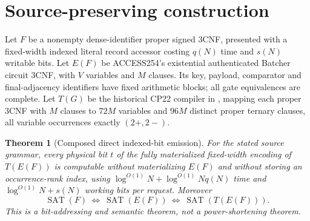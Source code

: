 \documentclass[11pt]{article}
\newtheorem{theorem}{Theorem}
\begin{document}
\section{Source-preserving construction}
Let $F$ be a nonempty dense-identifier proper signed 3CNF, presented with a fixed-width indexed literal record accessor costing $q(N)$ time and $s(N)$ writable bits. Let $E(F)$ be ACCESS254's existential authenticated Batcher circuit 3CNF, with $V$ variables and $M$ clauses. Its key, payload, comparator and final-adjacency identifiers have fixed arithmetic blocks; all gate equivalences are complete. Let $T(G)$ be the historical CP22 compiler in , mapping each proper 3CNF with $M$ clauses to $72M$ variables and $96M$ distinct proper ternary clauses, all variable occurrences exactly $(2+,2-)$.
\begin{theorem}[Composed direct indexed-bit emission]
For the stated source grammar, every physical bit $t$ of the fully materialized fixed-width encoding of $T(E(F))$ is computable without materializing $E(F)$ and without storing an occurrence-rank index, using $\log^{O(1)}N+\log^{O(1)}N q(N)$ time and $\log^{O(1)}N+s(N)$ working bits per request. Moreover
\[
 \operatorname{SAT}(F)\ \Longleftrightarrow\
 \operatorname{SAT}(E(F))\ \Longleftrightarrow\
 \operatorname{SAT}(T(E(F))).
\]
This is a bit-addressing and semantic theorem, not a power-shortening theorem.
\end{theorem}
\end{document}
